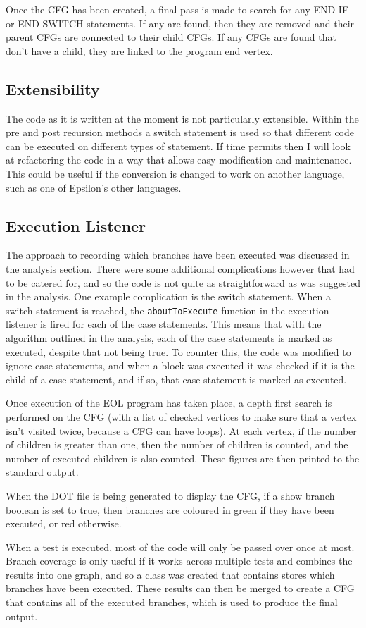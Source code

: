 Once the CFG has been created, a final pass is made to search for any END IF or END SWITCH statements. If any are found, then they are removed and their parent CFGs are connected to their child CFGs. If any CFGs are found that don't have a child, they are linked to the program end vertex.

\subsection{Extensibility}

The code as it is written at the moment is not particularly extensible. Within the pre and post recursion methods a switch statement is used so that different code can be executed on different types of statement. If time permits then I will look at refactoring the code in a way that allows easy modification and maintenance. This could be useful if the conversion is changed to work on another language, such as one of Epsilon's other languages. 

\subsection{Execution Listener}

The approach to recording which branches have been executed was discussed in the analysis section. There were some additional complications however that had to be catered for, and so the code is not quite as straightforward as was suggested in the analysis. One example complication is the switch statement. When a switch statement is reached, the \verb|aboutToExecute| function in the execution listener is fired for each of the case statements. This means that with the algorithm outlined in the analysis, each of the case statements is marked as executed, despite that not being true. To counter this, the code was modified to ignore case statements, and when a block was executed it was checked if it is the child of a case statement, and if so, that case statement is marked as executed.

Once execution of the EOL program has taken place, a depth first search is performed on the CFG (with a list of checked vertices to make sure that a vertex isn't visited twice, because a CFG can have loops). At each vertex, if the number of children is greater than one, then the number of children is counted, and the number of executed children is also counted. These figures are then printed to the standard output.

When the DOT file is being generated to display the CFG, if a show branch boolean is set to true, then branches are coloured in green if they have been executed, or red otherwise.

When a test is executed, most of the code will only be passed over once at most. Branch coverage is only useful if it works across multiple tests and combines the results into one graph, and so a class was created that contains stores which branches have been executed. These results can then be merged to create a CFG that contains all of the executed branches, which is used to produce the final output.